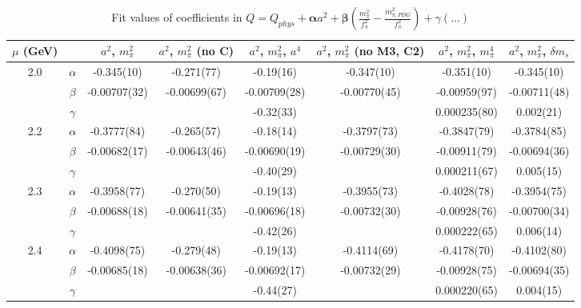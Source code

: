 \documentclass[12pt]{extarticle}
\begin{document}
\begin{table}[h!]
\begin{center}
\begin{tabular}{|c c|c|c|c|c|c|c|}
\hline
$\mu$ (GeV) &  & $a^2$, $m_\pi^2$& $a^2$, $m_\pi^2$ (no C)& $a^2$, $m_\pi^2$, $a^4$& $a^2$, $m_\pi^2$ (no M3, C2)& $a^2$, $m_\pi^2$, $m_\pi^4$& $a^2$, $m_\pi^2$, $\delta m_s$\\
\hline
\multirow{3}{0.5in}{2.0} & $\alpha$ & -0.345(10)& -0.271(77)& -0.19(16)& -0.347(10)& -0.351(10)& -0.345(10)\\
 & $\beta$ & -0.00707(32)& -0.00699(67)& -0.00709(28)& -0.00770(45)& -0.00959(97)& -0.00711(48)\\
 & $\gamma$ &  &  & -0.32(33)&  & 0.000235(80)& 0.002(21)\\
\hline
\multirow{3}{0.5in}{2.2} & $\alpha$ & -0.3777(84)& -0.265(57)& -0.18(14)& -0.3797(73)& -0.3847(79)& -0.3784(85)\\
 & $\beta$ & -0.00682(17)& -0.00643(46)& -0.00690(19)& -0.00729(30)& -0.00911(79)& -0.00694(36)\\
 & $\gamma$ &  &  & -0.40(29)&  & 0.000211(67)& 0.005(15)\\
\hline
\multirow{3}{0.5in}{2.3} & $\alpha$ & -0.3958(77)& -0.270(50)& -0.19(13)& -0.3955(73)& -0.4028(78)& -0.3954(75)\\
 & $\beta$ & -0.00688(18)& -0.00641(35)& -0.00696(18)& -0.00732(30)& -0.00928(76)& -0.00700(34)\\
 & $\gamma$ &  &  & -0.42(26)&  & 0.000222(65)& 0.006(14)\\
\hline
\multirow{3}{0.5in}{2.4} & $\alpha$ & -0.4098(75)& -0.279(48)& -0.19(13)& -0.4114(69)& -0.4178(70)& -0.4102(80)\\
 & $\beta$ & -0.00685(18)& -0.00638(36)& -0.00692(17)& -0.00732(29)& -0.00928(75)& -0.00694(35)\\
 & $\gamma$ &  &  & -0.44(27)&  & 0.000220(65)& 0.004(15)\\
\hline
\end{tabular}
\caption{Fit values of coefficients in $Q = Q_{phys} + \mathbf{\alpha} a^2 + \mathbf{\beta}\left(\frac{m_\pi^2}{f_\pi^2}-\frac{m_{\pi,PDG}^2}{f_\pi^2}\right) + \gamma(\ldots)$}
\end{center}
\end{table}





\end{document}
